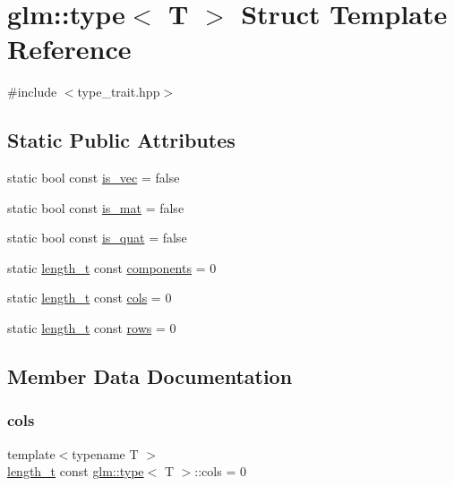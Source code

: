 \hypertarget{structglm_1_1type}{}\section{glm\+:\+:type$<$ T $>$ Struct Template Reference}
\label{structglm_1_1type}


{\ttfamily \#include $<$type\+\_\+trait.\+hpp$>$}

\subsection*{Static Public Attributes}
\begin{DoxyCompactItemize}
\item 
static bool const \hyperlink{structglm_1_1type_a236fedee521c9783b686e86c0e1405e0}{is\+\_\+vec} = false
\item 
static bool const \hyperlink{structglm_1_1type_a21702de90bcb0212e4856a22d947bfa3}{is\+\_\+mat} = false
\item 
static bool const \hyperlink{structglm_1_1type_ac0e332a405282f738486bc2134881df8}{is\+\_\+quat} = false
\item 
static \hyperlink{namespaceglm_a090a0de2260835bee80e71a702492ed9}{length\+\_\+t} const \hyperlink{structglm_1_1type_a678f2d75a5ec89fcaceb0934a52800b7}{components} = 0
\item 
static \hyperlink{namespaceglm_a090a0de2260835bee80e71a702492ed9}{length\+\_\+t} const \hyperlink{structglm_1_1type_aa1006a5c502504cd22582b088e675774}{cols} = 0
\item 
static \hyperlink{namespaceglm_a090a0de2260835bee80e71a702492ed9}{length\+\_\+t} const \hyperlink{structglm_1_1type_ad04a64a448a28061ed81f90f0f52b691}{rows} = 0
\end{DoxyCompactItemize}


\subsection{Member Data Documentation}
\mbox{\label{structglm_1_1type_aa1006a5c502504cd22582b088e675774}} 
\subsubsection{\texorpdfstring{cols}{cols}}
{\footnotesize\ttfamily template$<$typename T $>$ \\
\hyperlink{namespaceglm_a090a0de2260835bee80e71a702492ed9}{length\+\_\+t} const \hyperlink{structglm_1_1type}{glm\+::type}$<$ T $>$\+::cols = 0\hspace{0.3cm}{\ttfamily [static]}}

